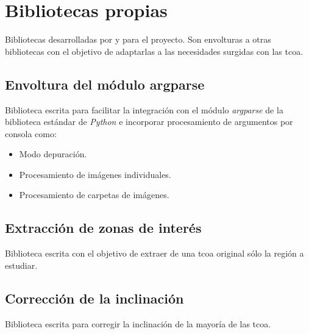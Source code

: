 \section{Bibliotecas propias}

Bibliotecas desarrolladas por y para el proyecto. Son envolturas a
otras bibliotecas con el objetivo de adaptarlas a las necesidades
surgidas con las \gls{tcoa}.

\subsection{Envoltura del módulo argparse}
Biblioteca escrita para facilitar la integración con el módulo
\emph{argparse} de la biblioteca estándar de \emph{Python} e incorporar
procesamiento de argumentos por consola como:
\begin{itemize}
\item Modo depuración.
\item Procesamiento de imágenes individuales.
\item Procesamiento de carpetas de imágenes.
\end{itemize}

\subsection{Extracción de zonas de interés}
Biblioteca escrita con el objetivo de extraer de una \gls{tcoa}
original sólo la región a estudiar.

\subsection{Corrección de la inclinación}
Biblioteca escrita para corregir la inclinación de la mayoría de las \gls{tcoa}.